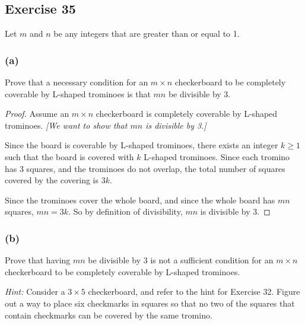 \documentclass[14pt]{extarticle}
\begin{document}
\subsection{Exercise 35}
Let $m$ and $n$ be any integers that are greater than or equal to 1.

\subsubsection{(a)}
Prove that a necessary condition for an $m \times n$ checkerboard to be completely coverable by L-shaped trominoes is that $mn$ be divisible by 3.

\begin{proof}
    Assume an $m \times n$ checkerboard is completely coverable by L-shaped trominoes. {\it [We want to show that $mn$ is divisible by 3.]}

    Since the board is coverable by L-shaped trominoes, there exists an integer $k \geq 1$ such that the board is covered with $k$ L-shaped trominoes. Since each tromino has 3 squares, and the trominoes do not overlap, the total number of squares covered by the covering is $3k$.

    Since the trominoes cover the whole board, and since the whole board has $mn$ squares, $mn = 3k$. So by definition of divisibility, $mn$ is divisible by 3.
\end{proof}

\subsubsection{(b)}
Prove that having $mn$ be divisible by 3 is not a sufficient condition for an $m \times n$ checkerboard to be completely coverable by L-shaped trominoes.

    {\it Hint:} Consider a $3 \times 5$ checkerboard, and refer to the hint for Exercise 32. Figure out a way to place six checkmarks in squares so that no two of the squares that contain checkmarks can be covered by the same tromino.
\end{document}
